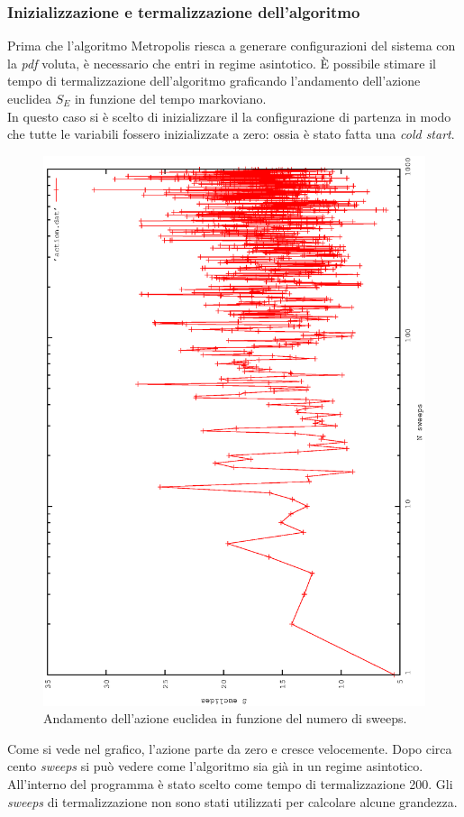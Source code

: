 \subsubsection{Inizializzazione e termalizzazione dell'algoritmo}
Prima che l'algoritmo Metropolis riesca a generare configurazioni del sistema con la \emph{pdf} voluta, è necessario che entri in regime asintotico.
È possibile stimare il tempo di termalizzazione dell'algoritmo graficando l'andamento dell'azione euclidea $S_E$ in funzione del tempo markoviano.\\
In questo caso si è scelto di inizializzare il la configurazione di partenza in modo che tutte le variabili fossero inizializzate a zero: ossia è stato fatta una
\emph{cold start}.
\begin{center}
  \begin{figure}[h]
    \includegraphics[width=0.6\columnwidth,angle = -90]{action_cold.eps}
    \caption{Andamento dell'azione euclidea in funzione del numero di sweeps.}
  \end{figure}
\end{center}
Come si vede nel grafico, l'azione parte da zero e cresce velocemente. Dopo circa cento \emph{sweeps} si può vedere come l'algoritmo sia già in un regime asintotico.
All'interno del programma è stato scelto come tempo di termalizzazione 200. Gli \emph{sweeps} di termalizzazione non sono stati utilizzati per calcolare alcune grandezza.

